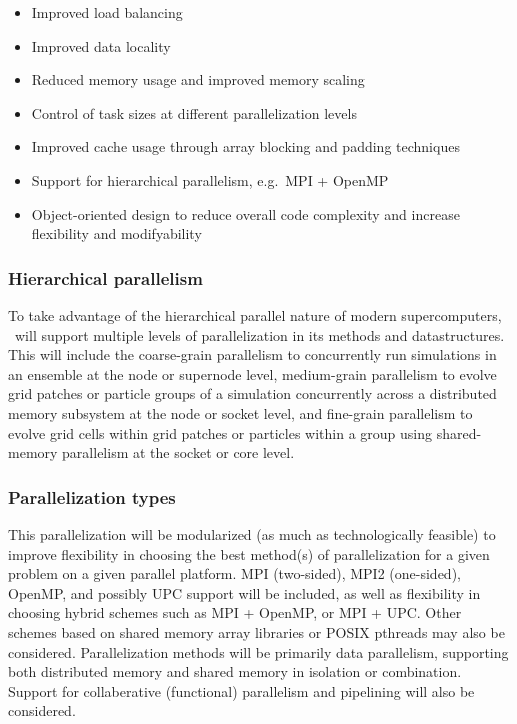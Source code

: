 \documentclass[11pt]{article}
\begin{document}
    \begin{itemize}
    \item Improved load balancing
    \item Improved data locality
    \item Reduced memory usage and improved memory scaling
    \item Control of task sizes at different parallelization levels
    \item Improved cache usage through array blocking and padding techniques
    \item Support for hierarchical parallelism, e.g.~MPI + OpenMP
    \item Object-oriented design to reduce overall code complexity and 
          increase flexibility and modifyability
    \end{itemize}

    \subsubsection{Hierarchical parallelism} 

    To take advantage of the hierarchical parallel nature of modern
    supercomputers, \cello\ will support multiple levels of
    parallelization in its methods and datastructures.  This will
    include the coarse-grain parallelism to concurrently run
    simulations in an ensemble at the node or supernode level,
    medium-grain parallelism to evolve grid patches or particle groups
    of a simulation concurrently across a distributed memory subsystem
    at the node or socket level, and fine-grain parallelism to evolve
    grid cells within grid patches or particles within a group using
    shared-memory parallelism at the socket or core level.

    \subsubsection{Parallelization types}  

    This parallelization will be modularized (as much as
    technologically feasible) to improve flexibility in choosing the
    best method(s) of parallelization for a given problem on a given
    parallel platform.  MPI (two-sided), MPI2 (one-sided), OpenMP, and
    possibly UPC support will be included, as well as flexibility in
    choosing hybrid schemes such as MPI + OpenMP, or MPI + UPC.  Other
    schemes based on shared memory array libraries or POSIX pthreads
    may also be considered.  Parallelization methods will be primarily
    data parallelism, supporting both distributed memory and shared
    memory in isolation or combination.  Support for collaberative
    (functional) parallelism and pipelining will also be considered.
\end{document}

